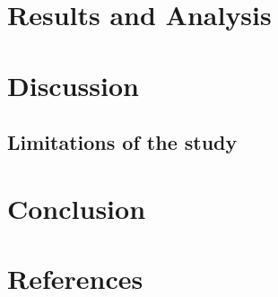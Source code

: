 \documentclass[12pt,preprint, authoryear]{elsarticle}
\numberwithin{equation}{section}
\numberwithin{figure}{section}
\numberwithin{table}{section}
\begin{document}
\hypertarget{section}{%
\section{}\label{section}}

\hypertarget{results-and-analysis}{%
\section{Results and Analysis}\label{results-and-analysis}}

\hypertarget{discussion}{%
\section{Discussion}\label{discussion}}

\hypertarget{limitations-of-the-study}{%
\subsection{Limitations of the study}\label{limitations-of-the-study}}

\hypertarget{conclusion-1}{%
\section{Conclusion}\label{conclusion-1}}

\newpage

\hypertarget{references}{%
\section{References}\label{references}}
\end{document}
